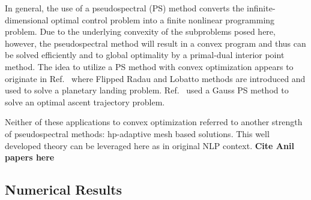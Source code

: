 \documentclass[10pt,a4paper]{article}
\begin{document}
	In general, the use of a pseudospectral (PS) method converts the infinite-dimensional optimal control problem into a finite nonlinear programming problem. Due to the underlying convexity of the subproblems posed here, however, the pseudospectral method will result in a convex program and thus can be solved efficiently and to global optimality by a primal-dual interior point method. The idea to utilize a PS method with convex optimization appears to originate in Ref.~\cite{PS_Convex} where Flipped Radau and Lobatto methods are introduced and used to solve a planetary landing problem. Ref.~\cite{PS_Convex_ascent} used a Gauss PS method to solve an optimal ascent trajectory problem. 
	
	Neither of these applications to convex optimization referred to another strength of pseudospectral methods: hp-adaptive mesh based solutions. This well developed theory can be leveraged here as in original NLP context. \textbf{Cite Anil papers here}
	
	
	
	\subsection{Numerical Results}

	
\end{document}
